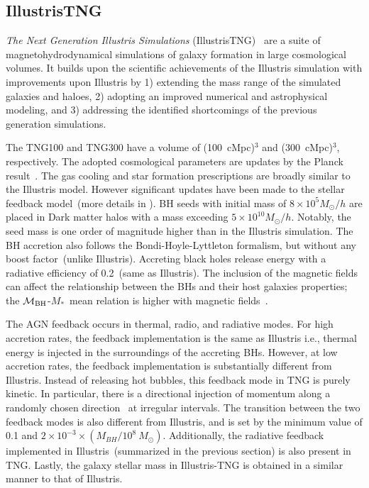 \documentclass[twocolumn]{aastex631}
\def\smass{{$M_*$}}
\def\mbh{$\mathcal M_{\rm BH}$}
\begin{document}
\subsection{IllustrisTNG}
{\it The Next Generation Illustris Simulations} (IllustrisTNG)~\citep{2018MNRAS.475..676S, Pillepich2018} are a suite of magnetohydrodynamical simulations of galaxy formation in large cosmological volumes. It builds upon the scientific achievements of the Illustris simulation with improvements upon Illustris by 1) extending the mass range of the simulated galaxies and haloes, 2) adopting an improved numerical and astrophysical modeling, and 3) addressing the identified shortcomings of the previous generation simulations.

The TNG100 and TNG300 have a volume of (100~cMpc)$^3$ and (300~cMpc)$^3$, respectively. The adopted cosmological parameters are updates by the Planck result~\citep{2016A&A...594A..13P}.
The gas cooling and star formation prescriptions are broadly similar to the Illustris model. However significant updates have been made to the stellar feedback model~(more details in \citealt{2018MNRAS.473.4077P}).
BH seeds with initial mass of $8 \times 10^5 M_{\odot}/h$ are placed in Dark matter halos with a mass exceeding $5 \times 10^{10} M_{\odot}/h$. Notably, the seed mass is one order of magnitude higher than in the Illustris simulation. The BH accretion also follows the Bondi-Hoyle-Lyttleton formalism, but without any boost factor~(unlike Illustris). Accreting black holes release energy with a radiative efficiency of 0.2~(same as Illustris). The inclusion of the magnetic fields can affect the relationship between the BHs and their host galaxies properties; the \mbh-\smass\ mean relation is higher with magnetic fields~\citep{2018MNRAS.473.4077P}. 

The AGN feedback occurs in thermal, radio, and radiative modes. For high accretion rates, the feedback implementation is the same as Illustris i.e., thermal energy is injected in the surroundings of the accreting BHs. However, at low accretion rates, the feedback implementation is substantially different from Illustris. Instead of releasing hot bubbles, this feedback mode in TNG is purely kinetic. In particular, there is a directional injection of momentum along a randomly chosen direction~\citep{2017MNRAS.465.3291W, 2018MNRAS.479.4056W} at irregular intervals. The transition between the two feedback modes is also different from Illustris, and is set by the minimum value of 0.1 and $2 \times 10 ^{-3} \times (M_{BH} / 10^8~M_{\odot})$. Additionally, the radiative feedback implemented in Illustris~(summarized in the previous section) is also present in TNG. Lastly, the galaxy stellar mass in Illustris-TNG is obtained in a similar manner to that of Illustris.
\end{document}
